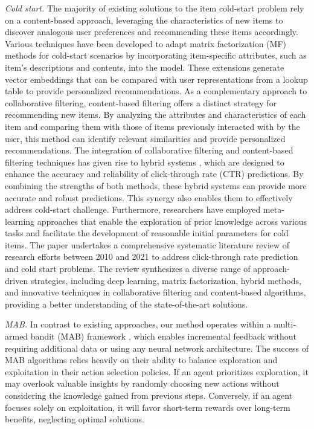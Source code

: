 \textit{Cold start.} The majority of existing solutions to the item cold-start problem rely on a content-based approach, leveraging the characteristics of new items to discover analogous user preferences and recommending these items accordingly. Various techniques \cite{agarwal2009regression, koren2008factorization} have been developed to adapt matrix factorization (MF) methods for cold-start scenarios by incorporating item-specific attributes, such as item's descriptions and contents, into the model. These extensions generate vector embeddings that can be compared with user representations from a lookup table to provide personalized recommendations. As a complementary approach to collaborative filtering, content-based filtering \cite{lops2011content} offers a distinct strategy for recommending new items. By analyzing the attributes and characteristics of each item and comparing them with those of items previously interacted with by the user, this method can identify relevant similarities and provide personalized recommendations. The integration of collaborative filtering and content-based filtering techniques has given rise to hybrid systems \cite{wei2016collaborative}, which are designed to enhance the accuracy and reliability of click-through rate (CTR) predictions. By combining the strengths of both methods, these hybrid systems can provide more accurate and robust predictions. This synergy also enables them to effectively address cold-start challenge. Furthermore, researchers  \cite{vartak2017meta, zheng2021cold} have employed meta-learning approaches \cite{vilalta2002perspective} that enable the exploration of prior knowledge across various tasks and facilitate the development of reasonable initial parameters for cold items. The paper \cite{panda2022approaches} undertakes a comprehensive systematic literature review of research efforts between 2010 and 2021 to address click-through rate prediction and cold start problems. The review synthesizes a diverse range of approach-driven strategies, including deep learning, matrix factorization, hybrid methods, and innovative techniques in collaborative filtering and content-based algorithms, providing a better understanding of the state-of-the-art solutions.

\textit{MAB.} In contrast to existing approaches, our method operates within a multi-armed bandit (MAB) framework \cite{auer2002finite, slivkins2019introduction}, which enables incremental feedback without requiring additional data or using any neural network architecture. The success of MAB algorithms relies heavily on their ability to balance exploration and exploitation in their action selection policies. If an agent prioritizes exploration, it may overlook valuable insights by randomly choosing new actions without considering the knowledge gained from previous steps. Conversely, if an agent focuses solely on exploitation, it will favor short-term rewards over long-term benefits, neglecting optimal solutions.


